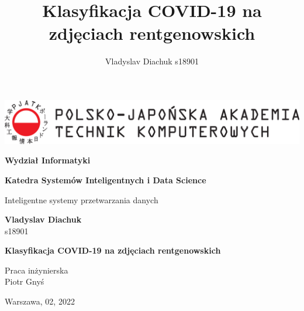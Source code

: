 \documentclass{article}
\title{Klasyfikacja COVID-19 na zdjęciach rentgenowskich}
\author{Vladyslav Diachuk s18901}
\begin{document}
\begin{titlepage}          
	\sffamily                                                                              
	\includegraphics[width=\textwidth]{pjwstk_logo}

	\vspace{1.4cm}
	
	\begin{center}
		{
			\Large
			\textbf{Wydział Informatyki}
			\vspace{1.4cm}
			
			\textbf{Katedra Systemów Inteligentnych i Data Science}
			\vspace{0.5cm}
			
			Inteligentne systemy przetwarzania danych
			\vspace{1.4cm}
			
			\textbf{Vladyslav Diachuk}\\
			s18901
		}
		\vspace{1.2cm}
		
		{\huge\textbf{Klasyfikacja COVID-19 na zdjęciach rentgenowskich}}
	\end{center}
	\vspace{2cm}
	
	\begin{flushright}
		\Large
		Praca inżynierska\\	
		\vspace{0.4cm}	
		Piotr Gnyś
	\end{flushright}
	\vspace{3cm}
	
	\begin{center}
		\Large
		Warszawa, 02, 2022
	\end{center}
	
\end{titlepage}
\end{document}
